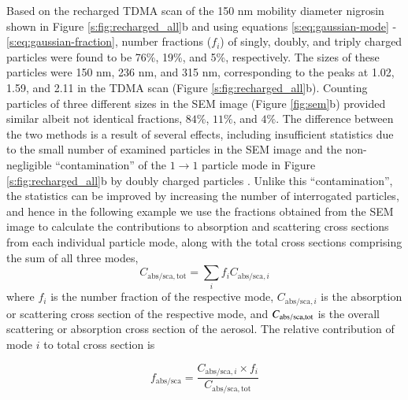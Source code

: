 Based on the recharged TDMA scan of the 150 nm mobility diameter nigrosin  shown in Figure \ref{s:fig:recharged_all}b and using equations \ref{s:eq:gaussian-mode} - \ref{s:eq:gaussian-fraction}, number fractions ($f_i$) of singly, doubly, and triply charged particles were found to be 76\%, 19\%, and 5\%, respectively. The sizes of these particles were 150 nm, 236 nm, and 315 nm, corresponding to the peaks at 1.02, 1.59, and 2.11 in the TDMA scan (Figure \ref{s:fig:recharged_all}b). Counting particles of three different sizes in the SEM image (Figure \ref{fig:sem}b) provided similar albeit not identical fractions, $84\%$, $11\%$, and $4\%$. The difference between the two methods is a result of several effects, including insufficient statistics due to the small number of examined particles in the SEM image and the non-negligible ``contamination'' of the $1\rightarrow 1$ particle mode in Figure \ref{s:fig:recharged_all}b by doubly charged particles \citep{RN7}. Unlike this ``contamination'', the statistics can be improved by increasing the number of interrogated particles, and hence in the following example we use the fractions obtained from the SEM image to calculate the contributions to absorption and scattering cross sections from each individual particle mode, along with the total cross sections comprising the sum of all three modes,
\begin{equation}
    C_\mathrm{abs/sca,tot}=\sum_{i}{f_iC_{\mathrm{abs/sca},i}}
    \label{eq:total_corss_section}
\end{equation}
where $f_i$ is the number fraction of the respective mode, $C_{\mathrm{abs/sca},i}$ is the absorption or scattering cross section of the respective mode, and $C_{\rm abs/sca,tot}$ is the overall scattering or absorption cross section of the aerosol. The relative contribution of mode $i$ to total cross section is

\begin{equation}
    f_{\mathrm{abs/sca}}=\frac{C_{\mathrm{abs/sca},i}\times f_i}{C_\mathrm{abs/sca,tot}}
    \label{eq:contribution}
\end{equation}

